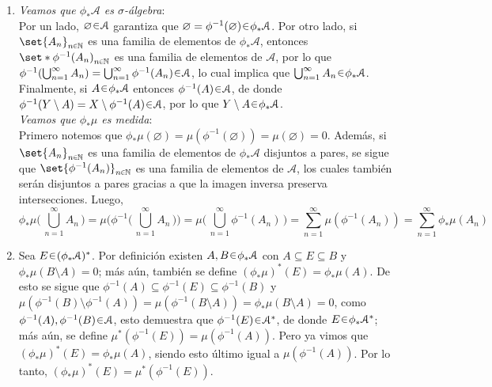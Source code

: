 \begin{sol}\vphantom{r}
\begin{enumerate}[label = (\roman*)]
\item %
\emph{Veamos que $\phi_*\mathcal{A}$ es $\sigma$-álgebra}:\\
Por un lado, $\varnothing \en \mathcal{A}$ garantiza que $\varnothing=\phi^{-1}(\varnothing)\en\phi_*\mathcal{A}$. Por otro lado, si $\set{A_n}_{n\en\mathbb{N}}$ es una familia de elementos de $\phi_*\mathcal{A}$, entonces $\set*{\phi^{-1}(A_n)}_{n\en\mathbb{N}}$ es una familia de elementos de $\mathcal{A}$, por lo que $\phi^{-1}(\bigcup^\infty_{n=1}A_n) = \bigcup^\infty_{n=1}\phi^{-1}(A_n) \en \mathcal{A}$, lo cual implica que $\bigcup^\infty_{n=1}A_n\en\phi_*\mathcal{A}$. Finalmente, si $A\en\phi_*\mathcal{A}$ entonces $\phi^{-1}(A) \en \mathcal{A}$, de donde $\phi^{-1}(Y\setminus A) = X\setminus \phi^{-1}(A) \en \mathcal{A}$, por lo que $Y\setminus A \en \phi_*\mathcal{A}$.\vspace{1em}\\
\emph{Veamos que $\phi_*\mu$ es medida}:\\
Primero notemos que $\phi_*\mu(\varnothing) = \mu(\phi^{-1}(\varnothing)) = \mu(\varnothing) = 0$. Además, si $\set{A_n}_{n\en\mathbb{N}}$ es una familia de elementos de $\phi_*\mathcal{A}$ disjuntos a pares, se sigue que $\set{\phi^{-1}(A_n)}_{n\en\mathbb{N}}$ es una familia de elementos de $\mathcal{A}$, los cuales también serán disjuntos a pares gracias a que la imagen inversa preserva intersecciones. Luego,
\[
\phi_*\mu\biggl(\, \bigcup^\infty_{n=1}A_n \,\biggr)
= \mu\biggl(\phi^{-1}\biggl(\, \bigcup^\infty_{n=1}A_n \,\biggr)\biggr)
= \mu\biggl(\, \bigcup^\infty_{n=1} \phi^{-1}(A_n) \,\biggr)
= \sum^\infty_{n=1}\mu(\phi^{-1}(A_n))
= \sum^\infty_{n=1} \phi_*\mu(A_n)
\]
\item %
Sea $E \en (\phi_*\mathcal{A})^*$. Por definición existen $A,B\en\phi_*\mathcal{A}$ con $A \subseteq E \subseteq B$ y $\phi_*\mu(B \setminus A) = 0$; más aún, también se define $(\phi_*\mu)^*(E) = \phi_*\mu(A)$. De esto se sigue que $\phi^{-1}(A) \subseteq \phi^{-1}(E) \subseteq \phi^{-1}(B)$ y $\mu(\phi^{-1}(B) \setminus \phi^{-1}(A)) = \mu(\phi^{-1}(B\setminus A)) = \phi_*\mu(B\setminus A) = 0$, como $\phi^{-1}(A),\phi^{-1}(B) \en \mathcal{A}$, esto demuestra que $\phi^{-1}(E) \en \mathcal{A}^*$, de donde $E \en \phi_*\mathcal{A}^*$; más aún, se define $\mu^*(\phi^{-1}(E)) = \mu(\phi^{-1}(A))$. Pero ya vimos que $(\phi_*\mu)^*(E) = \phi_*\mu(A)$, siendo esto último igual a $\mu(\phi^{-1}(A))$. Por lo tanto, $(\phi_*\mu)^*(E) = \mu^*(\phi^{-1}(E))$.\par

\end{enumerate}
\end{sol}
